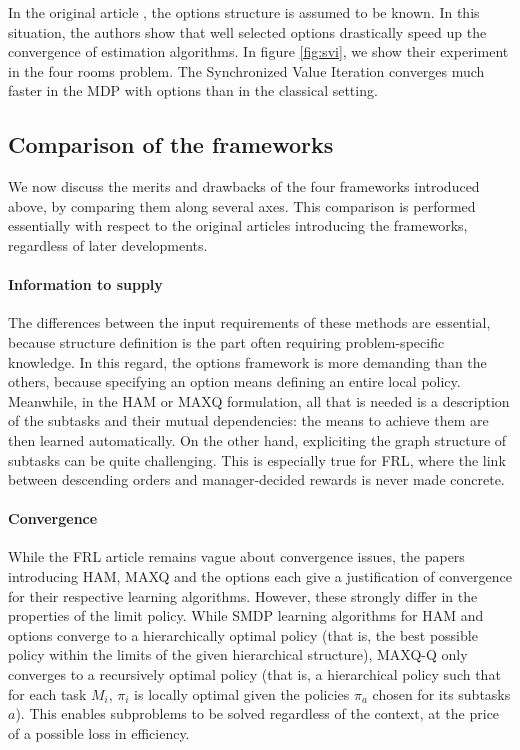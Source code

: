 \documentclass{article}
\begin{document}
In the original article \cite{sutton_between_1999}, the options structure is assumed to be known. In this situation, the authors show that well selected options drastically speed up the convergence of estimation algorithms. In figure \ref{fig:svi}, we show their experiment in the four rooms problem. The Synchronized Value Iteration converges much faster in the MDP with options than in the classical setting.

\subsection{Comparison of the frameworks}

We now discuss the merits and drawbacks of the four frameworks introduced above, by comparing them along several axes. This comparison is performed essentially with respect to the original articles introducing the frameworks, regardless of later developments.

\paragraph{Information to supply} The differences between the input requirements of these methods are essential, because structure definition is the part often requiring problem-specific knowledge. In this regard, the options framework is more demanding than the others, because specifying an option means defining an entire local policy. Meanwhile, in the HAM or MAXQ formulation, all that is needed is a description of the subtasks and their mutual dependencies: the means to achieve them are then learned automatically. On the other hand, expliciting the graph structure of subtasks can be quite challenging. This is especially true for FRL, where the link between descending orders and manager-decided rewards is never made concrete.

\paragraph{Convergence} While the FRL article remains vague about convergence issues, the papers introducing HAM, MAXQ and the options each give a justification of convergence for their respective learning algorithms. However, these strongly differ in the properties of the limit policy. While SMDP learning algorithms for HAM and options converge to a hierarchically optimal policy (that is, the best possible policy within the limits of the given hierarchical structure), MAXQ-Q only converges to a recursively optimal policy (that is, a hierarchical policy such that for each task $M_i$, $\pi_i$ is locally optimal given the policies $\pi_a$ chosen for its subtasks $a$). This enables subproblems to be solved regardless of the context, at the price of a possible loss in efficiency.
\end{document}

